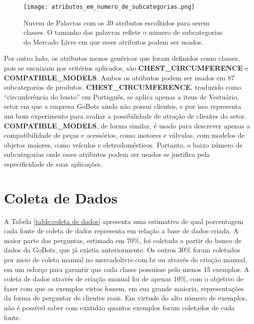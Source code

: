 \begin{figure}[!ht]
    \centering
	\texttt{[image: atributos\_em\_numero\_de\_subcategorias.png]}
	\caption{Nuvem de Palavras com os 39 atributos escolhidos para serem classes. O tamanho das palavras reflete o número de subcategorias do Mercado Livre em que esses atributos podem ser usados.}
	\label{fig:atributos_em_numero_de_subcategorias}
\end{figure}

Por outro lado, os atributos menos genéricos que foram definidos como classes, pois se encaixam nos critérios aplicados, são \textbf{CHEST\_CIRCUMFERENCE} e \textbf{COMPATIBLE\_MODELS}. Ambos os atributos podem ser usados em 87 subcategorias de produtos. \textbf{CHEST\_CIRCUMFERENCE}, traduzido como ``circunferência do busto'' em Português, se aplica apenas a itens de Vestuário, setor em que a empresa GoBots ainda não possui clientes, e por isso representa um bom experimento para avaliar a possibilidade de atração de clientes do setor. \textbf{COMPATIBLE\_MODELS}, de forma similar, é usado para descrever apenas a compatibilidade de peças e acessórios, como motores e válvulas, com modelos de objetos maiores, como veículos e eletrodomésticos. Portanto, o baixo número de subcategorias onde esses atributos podem ser usados se justifica pela especificidade de suas aplicações.

\section{Coleta de Dados}
\label{res:coleta_dados}
A Tabela \ref{table:coleta de dados} apresenta uma estimativa de qual porcentagem cada fonte de coleta de dados representa em relação a base de dados criada. A maior parte das perguntas, estimada em 70\%, foi coletada a partir do banco de dados da GoBots, que já existia anteriormente. Os outros 30\% foram coletados por meio de coleta manual no mercadolivre.com.br ou através de criação manual, em um esforço para garantir que cada classe possuísse pelo menos 15 exemplos. A coleta de dados através de criação manual foi de apenas 10\%, com o objetivo de fazer com que os exemplos vistos fossem, em sua grande maioria, representações da forma de perguntar de clientes reais. Em virtude do alto número de exemplos, não é possível saber com exatidão quantos exemplos foram coletados de cada fonte.


